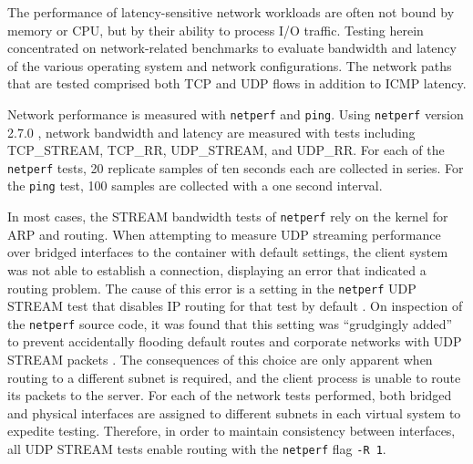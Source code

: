 %

The performance of latency-sensitive network workloads are often not bound by memory or CPU, but by their ability to process I/O traffic.
Testing herein concentrated on network-related benchmarks to evaluate bandwidth and latency of the various operating system and network configurations.
The network paths that are tested comprised both TCP and UDP flows in addition to ICMP latency.

Network performance is measured with \texttt{netperf} \autocite{netperfHome} and \texttt{ping}. 
Using \texttt{netperf} version 2.7.0 \autocite{netperfManual, netperfsource}, network bandwidth and latency are measured with tests including TCP\_STREAM, TCP\_RR, UDP\_STREAM, and UDP\_RR.
For each of the \texttt{netperf} tests, 20 replicate samples of ten seconds each are collected in series.  For the \texttt{ping} test, 100 samples are collected with a one second interval.  

In most cases, the STREAM bandwidth tests of \texttt{netperf} rely on the kernel for ARP and routing.  
When attempting to measure UDP streaming performance over bridged interfaces to the container with default settings, the client system was not able to establish a connection, displaying an error that indicated a routing problem.
The cause of this error is a setting in the \texttt{netperf} UDP STREAM test that disables IP routing for that test by default \autocite{stackoverflownetperf, netperfsource}.  
On inspection of the \texttt{netperf} source code, it was found that this setting was ``grudgingly added'' to prevent accidentally flooding default routes and corporate networks with UDP STREAM packets \autocite{netperfsource}.
The consequences of this choice are only apparent when routing to a different subnet is required, and the client process is unable to route its packets to the server.
For each of the network tests performed, both bridged and physical interfaces are assigned to different subnets in each virtual system to expedite testing.
Therefore, in order to maintain consistency between interfaces, all UDP STREAM tests enable routing with the \texttt{netperf} flag \texttt{-R 1}.

